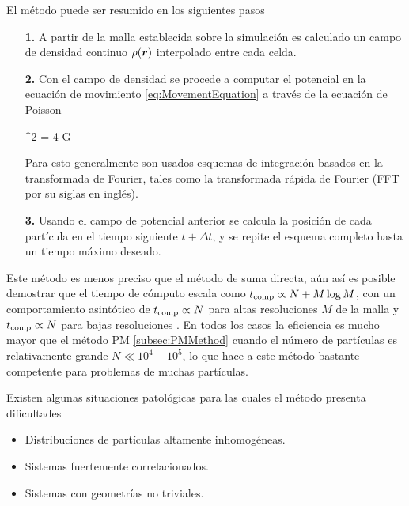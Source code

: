 \newpage
El método puede ser resumido en los siguientes pasos


\begin{itemize}
\item[\textbf{1.}] A partir de la malla establecida sobre la simulación es
calculado un campo de densidad continuo $\rho(\boldsymbol{ r })$ interpolado entre 
cada celda.

\item[\textbf{2.}] Con el campo de densidad se procede a computar el 
potencial en la ecuación de movimiento \ref{eq:MovementEquation} a través 
de la ecuación de Poisson


{ \nabla^2 \phi = 4 \pi G \rho }


Para esto generalmente son usados esquemas de integración basados en la
transformada de Fourier, tales como la transformada rápida de Fourier 
(FFT por su siglas en inglés).

\item[\textbf{3.}] Usando el campo de potencial anterior se calcula la 
posición de cada partícula en el tiempo siguiente $t+\Delta t$, y se 
repite el esquema completo hasta un tiempo máximo deseado.

\end{itemize}


Este método es menos preciso que el método de suma directa, aún así es 
posible demostrar que el tiempo de cómputo escala como $t_{\mbox{\scriptsize{comp}}} 
\propto N + M \log M$, con un comportamiento asintótico de 
$t_{\mbox{\scriptsize{comp}}} \propto N$ para altas resoluciones $M$ de la malla y 
$t_{\mbox{\scriptsize{comp}}} \propto N$ para bajas resoluciones \cite{pfalzner1996}.
En todos los casos la eficiencia es mucho mayor que el método PM 
\ref{subsec:PMMethod} cuando el número de partículas es relativamente 
grande $N\ll 10^4 - 10^5$, lo que hace a este método bastante competente 
para problemas de muchas partículas.


Existen algunas situaciones patológicas para las cuales el método presenta
dificultades \cite{pfalzner1996}


\begin{itemize}
\item Distribuciones de partículas altamente inhomogéneas.
\item Sistemas fuertemente correlacionados.
\item Sistemas con geometrías no triviales.
\end{itemize}


